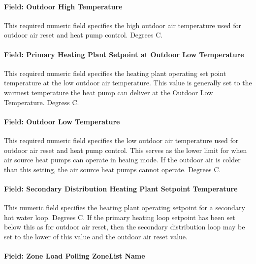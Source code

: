 \paragraph{Field: Outdoor High Temperature}\label{field-hot-water-high-outdoor-air-temp-plantequipmentoperationchillerheaterchangeover}

This required numeric field specifies the high outdoor air temperature used for outdoor air reset and heat pump control.  Degrees C.

\paragraph{Field: Primary Heating Plant Setpoint at Outdoor Low Temperature}\label{field-hot-water-setpoint-reset-max-temp-diff-plantequipmentoperationchillerheaterchangeover}

This required numeric field specifies the heating plant operating set point temperature at the low outdoor air temperature. This value is generally set to the warmest temperature the heat pump can deliver at the Outdoor Low Temperature.  Degress C.

\paragraph{Field: Outdoor Low Temperature}\label{field-hot-water-setpoint-reset-ratio-plantequipmentoperationchillerheaterchangeover}

This required numeric field specifies the low outdoor air temperature used for outdoor air reset and heat pump control.  This serves as the lower limit for when air source heat pumps can operate in heaing mode.  If the outdoor air is colder than this setting, the air source heat pumps cannot operate.  Degrees C.

\paragraph{Field: Secondary Distribution Heating Plant Setpoint Temperature}\label{secondary-distribution-heating-plant-setpoint-temperature}

This numeric field specifies the heating plant operating setpoint for a secondary hot water loop.  Degrees C.  If the primary heating loop setpoint has been set below this as for outdoor air reset, then the secondary distribution loop may be set to the lower of this value and the outdoor air reset value. 

\paragraph{Field: Zone Load Polling ZoneList Name}\label{field-zone-load-polling-zonelist-name-plantequipmentoperationchillerheaterchangeover}


